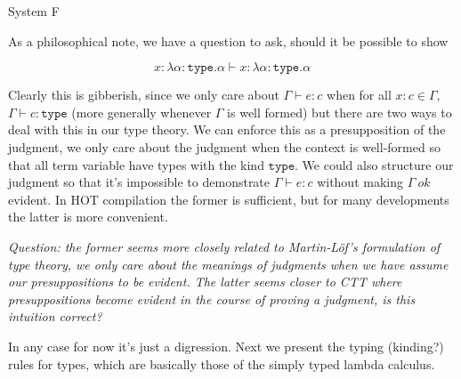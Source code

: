 \documentclass{amsart}
\newcommand{\type}{\ensuremath{\mathtt{type}}}
\begin{document}
\begin{section}{System F}

As a philosophical note, we have a question to ask, should it be
possible to show

\[
  x : \lambda \alpha : \type. \alpha \vdash x : \lambda \alpha : \type. \alpha
\]

Clearly this is gibberish, since we only care about
$\Gamma \vdash e : c$ when for all $x : c \in \Gamma$,
$\Gamma \vdash c : \type$ (more generally whenever $\Gamma$ is well
formed) but there are two ways to deal with this in our type
theory. We can enforce this as a presupposition of the judgment, we
only care about the judgment when the context is well-formed so that
all term variable have types with the kind $\type$. We could also
structure our judgment so that it's impossible to demonstrate
$\Gamma \vdash e : c$ without making $\Gamma\ ok$ evident. In HOT
compilation the former is sufficient, but for many developments the
latter is more convenient.

\emph{Question: the former seems more closely related to
  Martin-L{\"o}f's formulation of type theory, we only care about the
  meanings of judgments when we have assume our presuppositions to be
  evident. The latter seems closer to CTT where presuppositions become
  evident in the course of proving a judgment, is this intuition
  correct?}

In any case for now it's just a digression. Next we present the typing
(kinding?) rules for types, which are basically those of the simply
typed lambda calculus.



\end{section}
\end{document}
